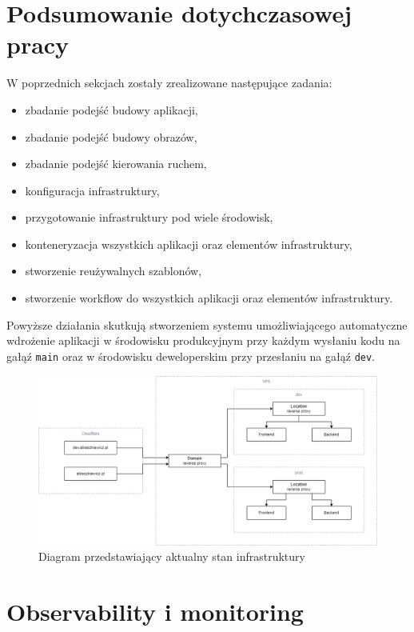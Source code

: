 \documentclass{article}
\begin{document}
\section{Podsumowanie dotychczasowej pracy}

W poprzednich sekcjach zostały zrealizowane następujące zadania:

\begin{itemize}
    \item zbadanie podejść budowy aplikacji,
    \item zbadanie podejść budowy obrazów,
    \item zbadanie podejść kierowania ruchem,
    \item konfiguracja infrastruktury,
    \item przygotowanie infrastruktury pod wiele środowisk,
    \item konteneryzacja wszystkich aplikacji oraz elementów infrastruktury,
    \item stworzenie reużywalnych szablonów,
    \item stworzenie workflow do wszystkich aplikacji oraz elementów infrastruktury.
\end{itemize}

Powyższe działania skutkują stworzeniem systemu umożliwiającego automatyczne wdrożenie aplikacji w środowisku produkcyjnym przy każdym wysłaniu kodu na gałąź \lstinline|main| oraz w środowisku deweloperskim przy przesłaniu na gałąź \lstinline|dev|.

\begin{figure}[H]
    \centering
    \includegraphics[width=1\linewidth]{diagramInfrasturkturaPolowaPracy.png}
    \caption{Diagram przedstawiający aktualny stan infrastruktury}
    \label{fig:enter-label}
\end{figure}


\section{Observability i monitoring}
\end{document}
